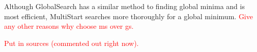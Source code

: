 \documentclass[12pt]{article}
\begin{document}
Although GlobalSearch has a similar method to finding global minima and is most efficient, MultiStart searches more thoroughly for a global minimum. \textcolor{red}{Give any other reasons why choose ms over gs.} %

\textcolor{red}{Put in sources (commented out right now).}
\end{document}

